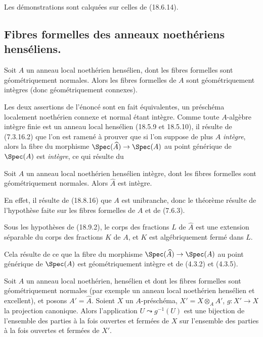 Les démonstrations sont calquées sur celles de (18.6.14).

\subsection{Fibres formelles des anneaux noethériens henséliens.}

\begin{theorem}[18.9.1]
\label{IV.18.9.1}
Soit $A$ un anneau local noethérien hensélien, dont les fibres formelles sont géométriquement normales. Alors les fibres formelles de $A$ sont géométriquement intègres \textup{(donc} géométriquement connexes\textup{)}.
\end{theorem}

Les deux assertions de l'énoncé sont en fait équivalentes, un préschéma localement noethérien connexe et normal étant intègre. Comme toute $A$-algèbre intègre finie est un anneau local hensélien (18.5.9 et 18.5.10), il résulte de (7.3.16.2) que l'on est ramené à prouver que si l'on suppose de plus $A$ \emph{intègre}, alors la fibre du morphisme $\Spec(\widehat A)\to\Spec(A)$ au point générique de $\Spec(A)$ est \emph{intègre}, ce qui résulte du

\begin{corollary}[18.9.2]
\label{IV.18.9.2}
Soit $A$ un anneau local noethérien hensélien intègre, dont les fibres formelles sont géométriquement normales. Alors $\widehat A$ est intègre.
\end{corollary}

En effet, il résulte de (18.8.16) que $A$ est unibranche, donc le théorème résulte de l'hypothèse faite sur les fibres formelles de $A$ et de (7.6.3).

\begin{corollary}[18.9.3]
\label{IV.18.9.3}
Sous les hypothèses de \textup{(18.9.2)}, le corps des fractions $L$ de $\widehat A$ est une extension séparable du corps des fractions $K$ de $A$, et $K$ est algébriquement fermé dans $L$.
\end{corollary}

Cela résulte de ce que la fibre du morphisme $\Spec(\widehat A)\to\Spec(A)$ au point générique de $\Spec(A)$ est géométriquement intègre et de (4.3.2) et (4.3.5).

\begin{corollary}[18.9.4]
\label{IV.18.9.4}
Soit $A$ un anneau local noethérien, hensélien et dont les fibres formelles sont géométriquement normales \textup{(par exemple un anneau local noethérien hensélien et} excellent\textup{)}, et posons $A'=\widehat A$. Soient $X$ un $A$-préschéma, $X'=X\otimes_A A'$, $g:X'\to X$ la projection canonique. Alors l'application $U\leadsto g^{-1}(U)$ est une bijection de l'ensemble des parties à la fois ouvertes et fermées de $X$ sur l'ensemble des parties à la fois ouvertes et fermées de $X'$.
\end{corollary}

